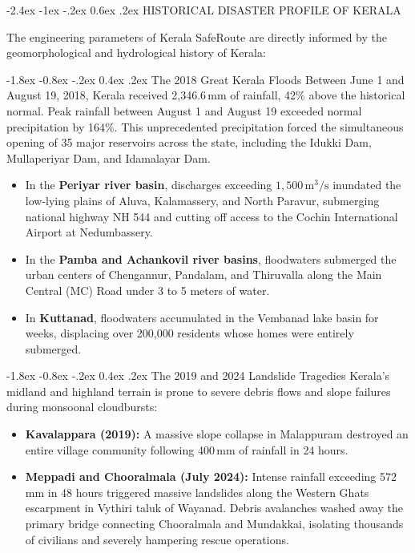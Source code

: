 \documentclass[12pt,oneside]{report}
\makeatletter
\renewcommand{\section}{\@startsection{section}{1}{\z@}%
  {-2.4ex \@plus -1ex \@minus -.2ex}%
  {0.6ex \@plus .2ex}%
  {\normalfont\large\bfseries}}
\renewcommand{\subsection}{\@startsection{subsection}{2}{\z@}%
  {-1.8ex \@plus -0.8ex \@minus -.2ex}%
  {0.4ex \@plus .2ex}%
  {\normalfont\normalsize\bfseries}}
\makeatother
\begin{document}
\section{HISTORICAL DISASTER PROFILE OF KERALA}

The engineering parameters of Kerala SafeRoute are directly informed by the geomorphological and hydrological history of Kerala:

\subsection{The 2018 Great Kerala Floods}
Between June 1 and August 19, 2018, Kerala received 2,346.6\,mm of rainfall, 42\% above the historical normal. Peak rainfall between August 1 and August 19 exceeded normal precipitation by 164\%. This unprecedented precipitation forced the simultaneous opening of 35 major reservoirs across the state, including the Idukki Dam, Mullaperiyar Dam, and Idamalayar Dam. 
\begin{itemize}
    \item In the \textbf{Periyar river basin}, discharges exceeding $1,500$\,$\text{m}^3/\text{s}$ inundated the low-lying plains of Aluva, Kalamassery, and North Paravur, submerging national highway NH 544 and cutting off access to the Cochin International Airport at Nedumbassery.
    \item In the \textbf{Pamba and Achankovil river basins}, floodwaters submerged the urban centers of Chengannur, Pandalam, and Thiruvalla along the Main Central (MC) Road under 3 to 5 meters of water.
    \item In \textbf{Kuttanad}, floodwaters accumulated in the Vembanad lake basin for weeks, displacing over 200,000 residents whose homes were entirely submerged.
\end{itemize}

\subsection{The 2019 and 2024 Landslide Tragedies}
Kerala's midland and highland terrain is prone to severe debris flows and slope failures during monsoonal cloudbursts:
\begin{itemize}
    \item \textbf{Kavalappara (2019):} A massive slope collapse in Malappuram destroyed an entire village community following 400\,mm of rainfall in 24 hours.
    \item \textbf{Meppadi and Chooralmala (July 2024):} Intense rainfall exceeding 572\,mm in 48 hours triggered massive landslides along the Western Ghats escarpment in Vythiri taluk of Wayanad. Debris avalanches washed away the primary bridge connecting Chooralmala and Mundakkai, isolating thousands of civilians and severely hampering rescue operations.
\end{itemize}
\end{document}
